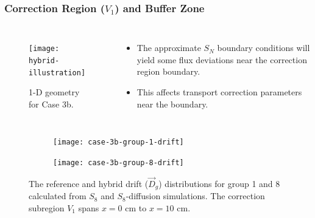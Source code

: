 \begin{frame}
  \frametitle{Correction Region ($V_1$) and Buffer Zone}

  \begin{columns}
    \column{5.5cm}
    \begin{figure}[htb!]
      \centering
      \texttt{[image: hybrid-illustration]}
      \caption{1-D geometry for Case 3b.}
      \label{fig:3b-geometry}
    \end{figure}
    \column{5.5cm}
    \begin{itemize}
      \item The approximate $S_N$ boundary conditions will yield some flux deviations near the correction
    region boundary.
      \item This affects transport correction parameters near the boundary.
    \end{itemize}
  \end{columns}
  \begin{figure}[htb!]
      \centering
      \begin{subfigure}[t]{.46\textwidth}
          \centering
          \texttt{[image: case-3b-group-1-drift]}
      \end{subfigure}
      \hfill
      \begin{subfigure}[t]{.46\textwidth}
          \centering
          \texttt{[image: case-3b-group-8-drift]}
      \end{subfigure}
      \caption{The reference and hybrid drift ($\vec{D}_g$) distributions for group 1 and 8 calculated
        from $S_8$ and $S_8$-diffusion simulations. The correction subregion $V_1$ spans $x=0$ cm to
        $x=10$ cm.}
      \label{fig:3b-drift-1}
  \end{figure}
\end{frame}

